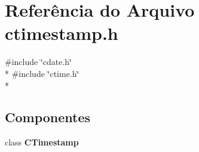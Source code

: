 \section{Referência do Arquivo ctimestamp.\+h}
\label{ctimestamp_8h}
{\ttfamily \#include \char`\"{}cdate.\+h\char`\"{}}\\*
{\ttfamily \#include \char`\"{}ctime.\+h\char`\"{}}\\*
\subsection*{Componentes}
\begin{DoxyCompactItemize}
\item 
class {\bf C\+Timestamp}
\end{DoxyCompactItemize}
